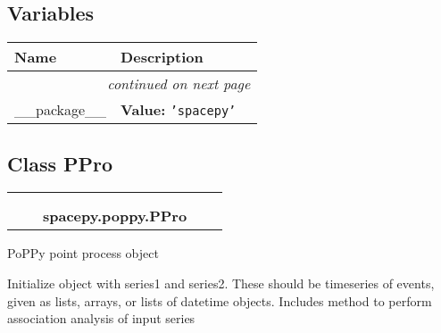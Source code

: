 
  \subsection{Variables}

    \vspace{-1cm}
\hspace{\varindent}\begin{longtable}{|p{\varnamewidth}|p{\vardescrwidth}|l}
\cline{1-2}
\cline{1-2} \centering \textbf{Name} & \centering \textbf{Description}& \\
\cline{1-2}
\endhead\cline{1-2}\multicolumn{3}{r}{\small\textit{continued on next page}}\\\endfoot\cline{1-2}
\endlastfoot\raggedright \_\-\_\-p\-a\-c\-k\-a\-g\-e\-\_\-\_\- & \raggedright \textbf{Value:} 
{\tt \texttt{'}\texttt{spacepy}\texttt{'}}&\\
\cline{1-2}
\end{longtable}



\subsection{Class PPro}

    \label{spacepy:poppy:PPro}
\begin{tabular}{cccccc}
\multicolumn{2}{r}{\settowidth{\BCL}{object}\multirow{2}{\BCL}{object}}
&&
  \\\cline{3-3}
  &&\multicolumn{1}{c|}{}
&&
  \\
&&\multicolumn{2}{l}{\textbf{spacepy.poppy.PPro}}
\end{tabular}

PoPPy point process object

Initialize object with series1 and series2. These should be timeseries of 
events, given as lists, arrays, or lists of datetime objects. Includes 
method to perform association analysis of input series

